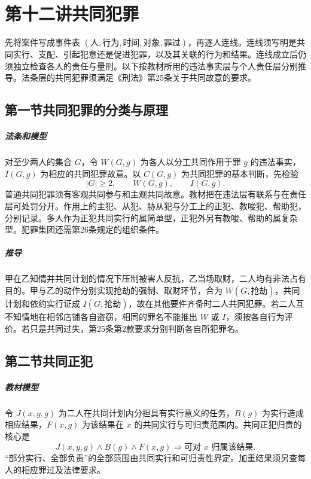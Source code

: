 \chapter{第十二讲\quad 共同犯罪}
\label{lecture:12}
\par

先将案件写成事件表 \((\text{人},\text{行为},\text{时间},\text{对象},\text{罪过})\)，再逐人连线。连线须写明是共同实行、支配、引起犯意还是促进犯罪，以及其关联的行为和结果。连线成立后仍须独立检查各人的责任与量刑。以下按教材所用的违法事实层与个人责任层分别推导。法条层的共同犯罪须满足《刑法》第25条关于共同故意的要求。

\section{第一节\quad 共同犯罪的分类与原理}

\paragraph{法条和模型}
对至少两人的集合 \(G\)，令 \(W(G,g)\) 为各人以分工共同作用于罪 \(g\) 的违法事实，\(I(G,g)\) 为相应的共同犯罪故意。以 \(C(G,g)\) 为共同犯罪的基本判断，先检验
\[
|G|\ge2,\qquad W(G,g),\qquad I(G,g).
\]
普通共同犯罪须有客观共同参与和主观共同故意。教材把在违法层有联系与在责任层可处罚分开。作用上的主犯、从犯、胁从犯与分工上的正犯、教唆犯、帮助犯，分别记录。多人作为正犯共同实行的属简单型，正犯外另有教唆、帮助的属复杂型。犯罪集团还需第26条规定的组织条件。

\paragraph{推导}
甲在乙知情并共同计划的情况下压制被害人反抗，乙当场取财，二人均有非法占有目的。甲与乙的动作分别实现抢劫的强制、取财环节，合为 \(W(G,\text{抢劫})\)，共同计划和依约实行证成 \(I(G,\text{抢劫})\)，故在其他要件齐备时二人共同犯罪。若二人互不知情地在相邻店铺各自盗窃，相同的罪名不能推出 \(W\) 或 \(I\)，须按各自行为评价。若只是共同过失，第25条第2款要求分别判断各自所犯罪名。

\section{第二节\quad 共同正犯}

\paragraph{教材模型}
令 \(J(x,y,g)\) 为二人在共同计划内分担具有实行意义的任务，\(B(g)\) 为实行造成相应结果，\(F(x,g)\) 为该结果在 \(x\) 的共同实行与可归责范围内。共同正犯归责的核心是
\[
J(x,y,g)\land B(g)\land F(x,g)
\Longrightarrow \text{可对 }x\text{ 归属该结果}.
\]
“部分实行、全部负责”的全部范围由共同实行和可归责性界定。加重结果须另查每人的相应罪过及法律要求。

